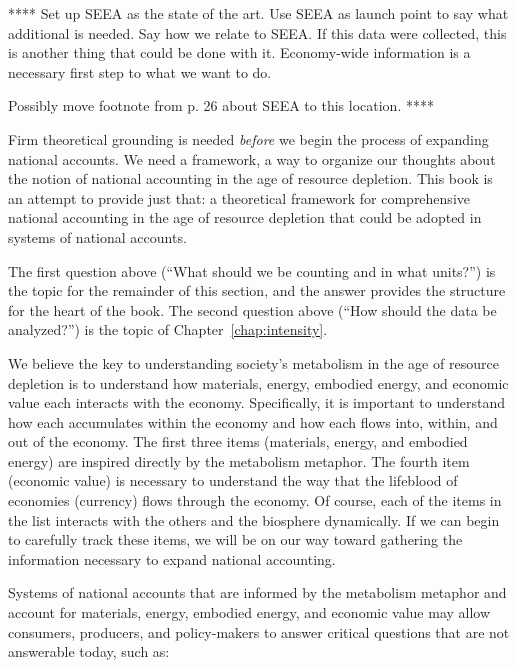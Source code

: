 **** 
Set up SEEA as the state of the art. 
Use SEEA as launch point to say what additional is needed.
Say how we relate to SEEA. 
If this data were collected, this is another thing that could be done with it.
Economy-wide information is a necessary first step to what we want to do.

Possibly move footnote from p. 26 about SEEA to this location.
****

Firm theoretical grounding is needed 
\emph{before} we begin the process of expanding national accounts.
We need a framework, a way to organize our thoughts about the notion 
of national accounting in the age of resource depletion.
This book is an attempt to provide just that: 
a theoretical framework
for comprehensive national accounting
in the age of resource depletion
that could be adopted in systems of national accounts.

The first question above (``What should we be counting and in what units?'') 
is the topic for the remainder of this section,
and the answer provides the structure for the heart of the book.
The second question above (``How should the data be analyzed?'')
is the topic of Chapter~\ref{chap:intensity}.

We believe the key to understanding society's metabolism
in the age of resource depletion is to understand how 
materials, energy, embodied energy, and economic value
each interacts with the economy.
Specifically, it is important to understand how each
accumulates within the economy and how each flows into, within, and out of the economy.
The first three items (materials, energy, and embodied energy) are
inspired directly by the metabolism metaphor.
The fourth item (economic value) is necessary to understand the way 
that the lifeblood of economies (currency) flows through the economy.
Of course, each of the items in the list interacts with the others 
and the biosphere dynamically.
If we can begin to carefully track these items, 
we will be on our way toward gathering the information necessary to 
expand national accounting.

Systems of national accounts that are informed by the metabolism metaphor 
and account for materials, energy, embodied energy, and economic value
may allow consumers, producers,
and policy-makers to answer critical questions that are not
answerable today, such as:

